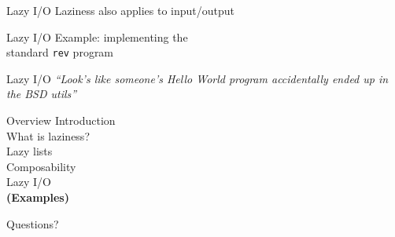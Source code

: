 \documentclass[20pt]{beamer}
\begin{document}
\begin{frame}{Lazy I/O}
    Laziness also applies to input/output
\end{frame}

\begin{frame}{Lazy I/O}
    Example: implementing the \\
    standard \texttt{rev} program
\end{frame}

\begin{frame}{Lazy I/O}
    \textit{``Look's like someone's Hello World program accidentally ended up in
    the BSD utils''}
\end{frame}


\begin{frame}{Overview}
    Introduction \\
    What is laziness? \\
    Lazy lists \\
    Composability \\
    Lazy I/O \\
    \textbf{(Examples)}
\end{frame}


\begin{frame}[plain]
    \begin{center}
    \huge{Questions?}
    \end{center}
\end{frame}
\end{document}
